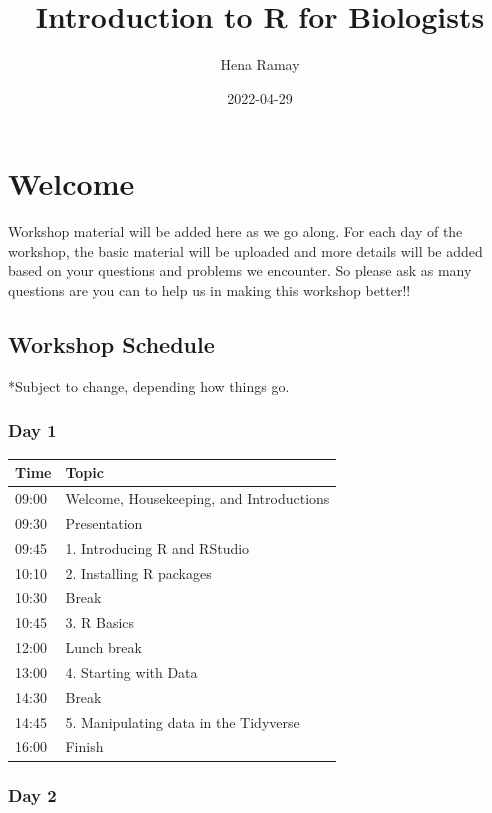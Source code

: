 \documentclass[
]{book}
\title{Introduction to R for Biologists}
\author{Hena Ramay}
\date{2022-04-29}
\begin{document}
\maketitle

{
\setcounter{tocdepth}{1}
\tableofcontents
}
\hypertarget{welcome}{%
\chapter{Welcome}\label{welcome}}

Workshop material will be added here as we go along. For each day of the workshop, the basic material will be uploaded and more details will be added based on your questions and problems we encounter. So please ask as many questions are you can to help us in making this workshop better!!

\hypertarget{workshop-schedule}{%
\section{Workshop Schedule}\label{workshop-schedule}}

*Subject to change, depending how things go.

\hypertarget{day-1}{%
\subsection*{Day 1}\label{day-1}}

\begin{longtable}[]{@{}ll@{}}
\toprule
Time & Topic \\
\midrule
\endhead
09:00 & Welcome, Housekeeping, and Introductions \\
09:30 & Presentation \\
09:45 & 1. Introducing R and RStudio \\
10:10 & 2. Installing R packages \\
10:30 & Break \\
10:45 & 3. R Basics \\
12:00 & Lunch break \\
13:00 & 4. Starting with Data \\
14:30 & Break \\
14:45 & 5. Manipulating data in the Tidyverse \\
16:00 & Finish \\
\bottomrule
\end{longtable}

\hypertarget{day-2}{%
\subsection*{Day 2}\label{day-2}}
\end{document}
